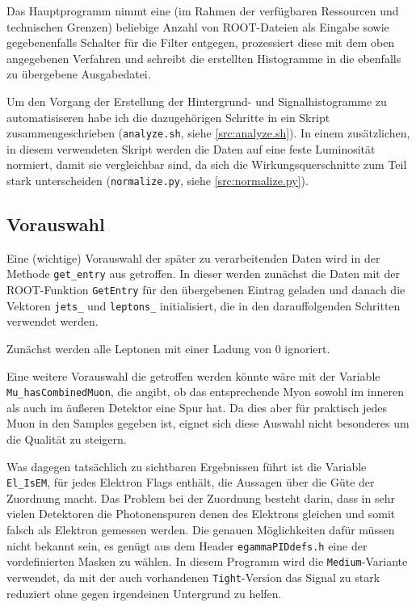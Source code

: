 Das Hauptprogramm nimmt eine (im Rahmen der verfügbaren Ressourcen und
technischen Grenzen) beliebige Anzahl von ROOT-Dateien als Eingabe sowie
gegebenenfalls Schalter für die Filter entgegen, prozessiert diese mit dem oben
angegebenen Verfahren und schreibt die erstellten Histogramme in die ebenfalls
zu übergebene Ausgabedatei.

Um den Vorgang der Erstellung der Hintergrund- und Signalhistogramme zu
automatisiseren habe ich die dazugehörigen Schritte in ein Skript
zusammengeschrieben (\verb'analyze.sh', siehe \ref{src:analyze.sh}). In einem
zusätzlichen, in diesem verwendeten Skript werden die Daten auf eine feste
Luminosität normiert, damit sie vergleichbar sind, da sich die
Wirkungsquerschnitte zum Teil stark unterscheiden (\verb'normalize.py', siehe
\ref{src:normalize.py}).

\subsection{Vorauswahl}
Eine (wichtige) Vorauswahl der später zu verarbeitenden Daten wird in der
Methode \lstinline'get_entry' aus  getroffen. In dieser werden
zunächst die Daten mit der ROOT-Funktion \lstinline'GetEntry' für den
übergebenen Eintrag geladen und danach die Vektoren \lstinline'jets_' und
\lstinline'leptons_' initialisiert, die in den darauffolgenden Schritten
verwendet werden.

Zunächst werden alle Leptonen mit einer Ladung von $0$ ignoriert.

Eine weitere Vorauswahl die getroffen werden könnte wäre mit der Variable
\lstinline'Mu_hasCombinedMuon', die angibt, ob das entsprechende Myon sowohl im
inneren als auch im äußeren Detektor eine Spur hat. Da dies aber für praktisch
jedes Muon in den Samples gegeben ist, eignet sich diese Auswahl nicht
besonderes um die Qualität zu steigern.

Was dagegen tatsächlich zu sichtbaren Ergebnissen führt ist die Variable
\lstinline'El_IsEM', für jedes Elektron Flags enthält, die Aussagen über die
Güte der Zuordnung macht. Das Problem bei der Zuordnung besteht darin, dass in
sehr vielen Detektoren die Photonenspuren denen des Elektrons gleichen und somit
falsch als Elektron gemessen werden. Die genauen Möglichkeiten dafür müssen
nicht bekannt sein, es genügt aus dem Header \texttt{egammaPIDdefs.h} eine der
vordefinierten Masken zu wählen. In diesem Programm wird die
\lstinline'Medium'-Variante verwendet, da mit der auch vorhandenen
\lstinline'Tight'-Version das Signal zu stark reduziert ohne gegen irgendeinen
Untergrund zu helfen.

